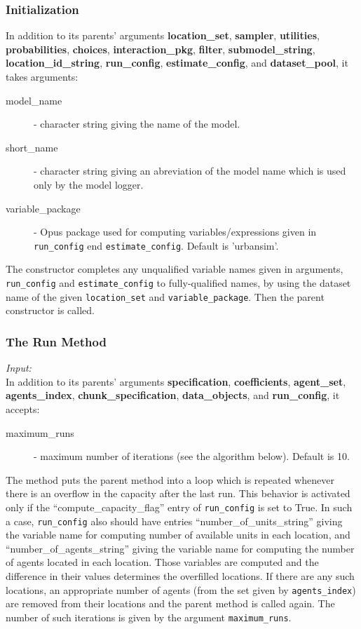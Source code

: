 \subsubsection{Initialization}
%
In addition to its parents' arguments {\bf location_set}, {\bf sampler}, {\bf utilities}, {\bf probabilities}, 
{\bf choices}, {\bf interaction_pkg}, {\bf filter}, {\bf submodel_string}, {\bf location_id_string}, 
{\bf run_config}, {\bf estimate_config}, and {\bf dataset_pool}, it takes arguments:
\begin{description}
\item[model_name] - character string giving the name of the model.
\item[short_name] - character string giving an abreviation of the model name which is used 
only by the model logger.
\item[variable_package] - Opus package used for computing variables/expressions given in \verb|run_config|
end \verb|estimate_config|. Default is 'urbansim'.
\end{description}

The constructor completes any unqualified variable names given in 
arguments, \verb|run_config| and \verb|estimate_config| to fully-qualified
names, by using the dataset name of the given \verb|location_set| and  \verb|variable_package|.
Then the parent constructor is called.

\subsubsection{The Run Method}
%
{\it Input:}\\[1mm]
In addition to its parents' arguments {\bf specification}, {\bf coefficients}, {\bf agent_set}, {\bf agents_index},
{\bf chunk_specification}, {\bf data_objects}, and {\bf run_config}, it accepts:
\begin{description}
\item[maximum_runs] - maximum number of iterations (see the algorithm below). Default is 10.
\end{description}
The method puts the parent method
 into a loop which is repeated whenever there is an
overflow in the capacity after the last run. This behavior is
activated only if the ``compute_capacity_flag'' entry of
\verb|run_config| is set to True. In such a case, \verb|run_config|
also should have entries ``number_of_units_string'' giving the
variable name for computing number of available
units in each location, and ``number_of_agents_string'' giving the
variable name for computing the number of agents
located in each location. Those variables are
computed and the difference in their values determines the
overfilled locations. If there are any such locations, an
appropriate number of agents (from the set given by
\verb|agents_index|) are removed from their locations and the parent
 method is called again. The number of such iterations is
given by the argument \verb|maximum_runs|.

